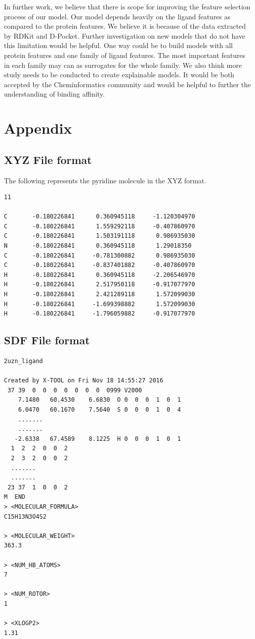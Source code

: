 \documentclass[11pt]{article}
\begin{document}
In further work,  we believe that there is scope for improving the feature selection process of our model.
Our model depends heavily on the ligand features as compared to the protein features.
We believe it is because of the data extracted by RDKit and D-Pocket.
Further investigation on new models that do not have this limitation would be helpful.
One way could be to build models with all protein features and one family of ligand features. 
The most important features in each family may can as surrogates for the whole family.
We also think more study needs to be conducted to create explainable models.
It would be both accepted by the Cheminformatics community and would be helpful to further the understanding of binding affinity.




\section{Appendix}
\subsection{XYZ File format}
\label{XYZFileexampleref}
The following represents the pyridine molecule in the XYZ format.
\begin{verbatim}
11

C       -0.180226841      0.360945118     -1.120304970
C       -0.180226841      1.559292118     -0.407860970
C       -0.180226841      1.503191118      0.986935030
N       -0.180226841      0.360945118      1.29018350
C       -0.180226841     -0.781300882      0.986935030
C       -0.180226841     -0.837401882     -0.407860970
H       -0.180226841      0.360945118     -2.206546970
H       -0.180226841      2.517950118     -0.917077970
H       -0.180226841      2.421289118      1.572099030
H       -0.180226841     -1.699398882      1.572099030
H       -0.180226841     -1.796059882     -0.917077970
\end{verbatim}

\subsection{SDF File format}
\label{SDFFileexampleref}
\begin{verbatim}
2uzn_ligand

Created by X-TOOL on Fri Nov 18 14:55:27 2016
 37 39  0  0  0  0  0  0  0  0999 V2000
    7.1480   60.4530    6.6830  O 0  0  0  1  0  1
    6.0470   60.1670    7.5640  S 0  0  0  1  0  4
    .......
    .......
   -2.6338   67.4589    8.1225  H 0  0  0  1  0  1
  1  2  2  0  0  2
  2  3  2  0  0  2
  .......
  .......
 23 37  1  0  0  2
M  END
> <MOLECULAR_FORMULA>
C15H13N3O4S2

> <MOLECULAR_WEIGHT>
363.3

> <NUM_HB_ATOMS>
7  

> <NUM_ROTOR>
1  

> <XLOGP2>
1.31 
\end{verbatim}
\end{document}
